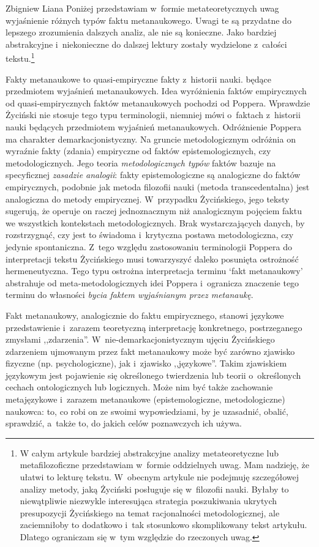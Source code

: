 \begin{artplenv}{Zbigniew Liana}
Poniżej przedstawiam w~formie metateoretycznych uwag wyjaśnienie różnych typów faktu metanaukowego. Uwagi te są
przydatne do lepszego zrozumienia dalszych analiz, ale nie są konieczne. Jako bardziej abstrakcyjne i~niekonieczne do
dalszej lektury zostały wydzielone z~całości tekstu.\footnote{W całym artykule bardziej abstrakcyjne analizy
metateoretyczne lub metafilozoficzne przedstawiam w~formie oddzielnych uwag. Mam nadzieję, że ułatwi to lekturę
tekstu. W~obecnym artykule nie podejmuję szczegółowej analizy metody, jaką Życiński posługuje się w~filozofii nauki. Byłaby to
niewątpliwie niezwykle interesująca strategia poszukiwania ukrytych presupozycji Życińskiego na temat racjonalności
metodologicznej, ale zaciemniłoby to dodatkowo i~tak stosunkowo skomplikowany tekst artykułu. Dlatego ograniczam się w~tym
względzie do rzeczonych uwag.}


\begin{uwaga}
Fakty metanaukowe to quasi-empiryczne fakty z~historii nauki. będące przedmiotem wyjaśnień
metanaukowych. Idea wyróżnienia faktów empirycznych od quasi-empirycznych faktów metanaukowych pochodzi od Poppera.
Wprawdzie Życiński nie stosuje tego typu terminologii, niemniej mówi o~faktach z~historii nauki będących przedmiotem
wyjaśnień metanaukowych. Odróżnienie Poppera ma charakter demarkacjonistyczny. Na gruncie metodologicznym odróżnia on
wyraźnie fakty (zdania) empiryczne od faktów epistemologicznych, czy metodologicznych. Jego teoria
\textit{metodologicznych typów} faktów bazuje na specyficznej \textit{zasadzie analogii}: fakty epistemologiczne są
analogiczne do faktów empirycznych, podobnie jak metoda filozofii nauki (metoda transcedentalna) jest analogiczna do
metody empirycznej. W~przypadku Życińskiego, jego teksty sugerują, że operuje on raczej jednoznacznym niż analogicznym
pojęciem faktu we wszystkich kontekstach metodologicznych. Brak wystarczających danych, by rozstrzygnąć, czy jest to
świadoma i~krytyczna postawa metodologiczna, czy jedynie spontaniczna. Z~tego względu zastosowaniu terminologii Poppera
do interpretacji tekstu Życińskiego musi towarzyszyć daleko posunięta ostrożność hermeneutyczna. Tego typu ostrożna
interpretacja terminu `fakt metanaukowy' abstrahuje od meta-metodologicznych idei Poppera i~ogranicza znaczenie tego
terminu do własności \textit{bycia faktem wyjaśnianym przez metanaukę}.
\end{uwaga}

\begin{uwaga}
Fakt metanaukowy, analogicznie do faktu empirycznego, stanowi językowe przedstawienie i~zarazem
teoretyczną interpretację konkretnego, postrzeganego zmysłami ,,zdarzenia''. W~nie-demarkacjonistycznym ujęciu
Życińskiego zdarzeniem ujmowanym przez fakt metanaukowy może być zarówno zjawisko fizyczne (np. psychologiczne), jak i~zjawisko
,,językowe''. Takim zjawiskiem językowym jest pojawienie się określonego twierdzenia lub teorii o~określonych
cechach ontologicznych lub logicznych. Może nim być także zachowanie metajęzykowe i~zarazem metanaukowe
(epistemologiczne, metodologiczne) naukowca: to, co robi on ze swoimi wypowiedziami, by je uzasadnić, obalić,
sprawdzić, a~także to, do jakich celów poznawczych ich używa.


\end{uwaga}
\end{artplenv}
